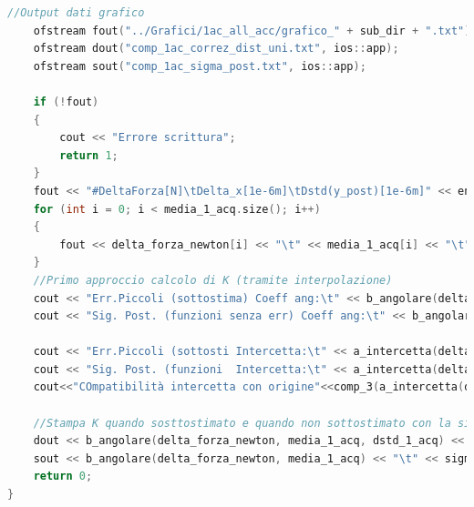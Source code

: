\documentclass[a4paper,11pt,oneside]{article}
\begin{document}
\begin{lstlisting}[language=C++, label=lst:analisi_1ac, caption=analisi\_1ac]
    //Output dati grafico
    ofstream fout("../Grafici/1ac_all_acc/grafico_" + sub_dir + ".txt");
    ofstream dout("comp_1ac_correz_dist_uni.txt", ios::app);
    ofstream sout("comp_1ac_sigma_post.txt", ios::app);

    if (!fout)
    {
        cout << "Errore scrittura";
        return 1;
    }
    fout << "#DeltaForza[N]\tDelta_x[1e-6m]\tDstd(y_post)[1e-6m]" << endl; //Stampa descrizione colonne per rendere migliore la lettura del file all'utilizzatore finale
    for (int i = 0; i < media_1_acq.size(); i++)                           //usiamo sigma post perchè più gramde di dev std (anche dopo confronto con dist uni)
    {
        fout << delta_forza_newton[i] << "\t" << media_1_acq[i] << "\t" << sigma_y_posteriori(delta_forza_newton, media_1_acq) << endl;
    }
    //Primo approccio calcolo di K (tramite interpolazione)
    cout << "Err.Piccoli (sottostima) Coeff ang:\t" << b_angolare(delta_forza_newton, media_1_acq, dstd_1_acq) << " +/- " << sigma_b(delta_forza_newton, media_1_acq, dstd_1_acq) << endl;
    cout << "Sig. Post. (funzioni senza err) Coeff ang:\t" << b_angolare(delta_forza_newton, media_1_acq) << " +/- " << sigma_b(delta_forza_newton, media_1_acq) << endl;

    cout << "Err.Piccoli (sottosti Intercetta:\t" << a_intercetta(delta_forza_newton, media_1_acq, dstd_1_acq) << " +/- " << sigma_a(delta_forza_newton, media_1_acq, dstd_1_acq) << endl;
    cout << "Sig. Post. (funzioni  Intercetta:\t" << a_intercetta(delta_forza_newton, media_1_acq) << " +/- " << sigma_a(delta_forza_newton, media_1_acq) << endl;
    cout<<"COmpatibilità intercetta con origine"<<comp_3(a_intercetta(delta_forza_newton, media_1_acq), 0, sigma_a(delta_forza_newton, media_1_acq), sigma_y_posteriori(delta_forza_newton, media_1_acq))<<endl;

    //Stampa K quando sosttostimato e quando non sottostimato con la sigma posteriori
    dout << b_angolare(delta_forza_newton, media_1_acq, dstd_1_acq) << "\t" << sigma_b(delta_forza_newton, media_1_acq, dstd_1_acq) << "\t" << a_intercetta(delta_forza_newton, media_1_acq, dstd_1_acq) << "\t" << sigma_a(delta_forza_newton, media_1_acq, dstd_1_acq) << endl;
    sout << b_angolare(delta_forza_newton, media_1_acq) << "\t" << sigma_b(delta_forza_newton, media_1_acq) << "\t" << a_intercetta(delta_forza_newton, media_1_acq) << "\t" << sigma_a(delta_forza_newton, media_1_acq) << endl;
    return 0;
}
\end{lstlisting}
\end{document}
